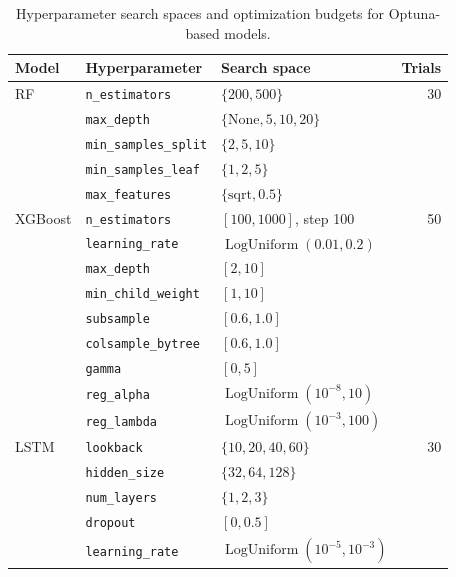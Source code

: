 \documentclass[runningheads,orivec]{llncs}
\begin{document}
\begin{table}[htbp]
\centering
\caption{Hyperparameter search spaces and optimization budgets for Optuna-based models.}\label{tab:optuna_search_spaces}
\setlength{\tabcolsep}{4.5pt}
\begin{tabular}{lllr}
\hline
Model & Hyperparameter & Search space & Trials \\
\hline
RF & \texttt{n\_estimators}      & $\{200, 500\}$                    & 30 \\
   & \texttt{max\_depth}         & $\{\text{None}, 5, 10, 20\}$      & \\
   & \texttt{min\_samples\_split}& $\{2, 5, 10\}$                    & \\
   & \texttt{min\_samples\_leaf} & $\{1, 2, 5\}$                     & \\
   & \texttt{max\_features}      & $\{\text{sqrt}, 0.5\}$            & \\
\hline
XGBoost & \texttt{n\_estimators}     & $[100, 1000]$, step 100           & 50 \\
        & \texttt{learning\_rate}    & $\operatorname{LogUniform}(0.01, 0.2)$ & \\
        & \texttt{max\_depth}        & $[2, 10]$                         & \\
        & \texttt{min\_child\_weight}& $[1, 10]$                         & \\
        & \texttt{subsample}         & $[0.6, 1.0]$                      & \\
        & \texttt{colsample\_bytree} & $[0.6, 1.0]$                      & \\
        & \texttt{gamma}             & $[0, 5]$                          & \\
        & \texttt{reg\_alpha}        & $\operatorname{LogUniform}(10^{-8}, 10)$ & \\
        & \texttt{reg\_lambda}       & $\operatorname{LogUniform}(10^{-3}, 100)$ & \\
\hline
LSTM & \texttt{lookback}      & $\{10, 20, 40, 60\}$                        & 30 \\
     & \texttt{hidden\_size}   & $\{32, 64, 128\}$                           & \\
     & \texttt{num\_layers}    & $\{1, 2, 3\}$                               & \\
     & \texttt{dropout}       & $[0, 0.5]$                                  & \\
     & \texttt{learning\_rate} & $\operatorname{LogUniform}(10^{-5}, 10^{-3})$ & \\

\end{tabular}
\end{table}
\end{document}
